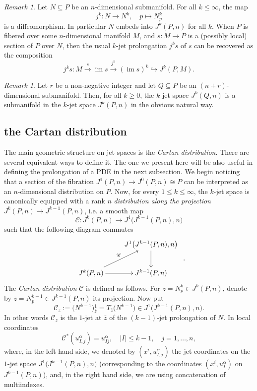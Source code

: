 \documentclass{conm-p-l}
\theoremstyle{definition}
\theoremstyle{remark}
\newtheorem{remark}[theorem]{Remark}
\numberwithin{equation}{section}
\begin{document}
\begin{remark}\label{rem:emb_N}
Let $N \subseteq P$ be an $n$-dimensional submanifold. For all $k \leq \infty$, the map
\[
j^k : N \to N^k, \quad p \mapsto N^k_p
\]
is a diffeomorphism. In particular $N$ embeds into $J^k (P, n)$ for all $k$.  
When $P$ is fibered over some $n$-dimensional manifold $M$, and $s : M \to P$ is a (possibly local) section of $P$ over $N$, then the usual $k$-jet prolongation $j^k s$ of $s$ can be recovered as the composition
\[
j^k s : M \overset{s}{\longrightarrow} \operatorname{im} s \overset{j^k}{\longrightarrow} (\operatorname{im} s)^k \hookrightarrow J^k (P, M).
\]
  
\end{remark}

\begin{remark}\label{rem:jet_emb}
Let $r$ be a non-negative integer and let $Q \subseteq P$ be an $(n+r)$-dimensional submanifold. Then, for all $k \geq 0$, the $k$-jet space $J^k (Q, n)$ is a submanifold in the $k$-jet space $J^k (P, n)$ in the obvious natural way.
\end{remark}

\subsection{the Cartan distribution}\label{Sec:CD}
The main geometric structure on jet spaces is the \emph{Cartan distribution}. There are several equivalent ways to define it. The one we present here will be also useful in defining the prolongation of a PDE in the next subsection. We begin noticing that a section of the fibration $J^1 (P, n) \to J^0 (P, n) \cong P$ can be interpreted as an $n$-dimensional distribution on $P$. Now, for every $1 \leq k \leq \infty$, the $k$-jet space is canonically equipped with a rank $n$ \emph{distribution along the projection $J^{k} (P, n) \to J^{k-1}(P, n)$}, i.e.{} a smooth map
\[
\mathscr C : J^k (P, n) \longrightarrow J^1 \big(J^{k-1} (P, n), n\big)
\]
such that the following diagram commutes
\[
\begin{array}{c}
\xymatrix{
 & J^1 \big(J^{k-1} (P, n), n\big) \ar[d] \\
 J^k (P, n) \ar[ur]^-{\mathscr C} \ar[r] & J^{k-1} (P, n)
}
\end{array}.
\]
The \emph{Cartan distribution} $\mathscr C$ is defined as follows. For $z = N^k_p \in J^k (P, n)$, denote by $\bar z = N^{k-1}_p \in J^{k-1}(P, n)$ its projection. Now put
\[
\mathscr C_z := \big( N^{k-1} \big){}^1_{\bar z} = T_{\bar z} \big(N^{k-1} \big) \in J^1 \big(J^{k-1} (P, n), n\big).
\]
In other words $\mathscr C_z$ is the $1$-jet at $\bar z$ of the $(k-1)$-jet prolongation of $N$. In local coordinates
\begin{equation}\label{eq:C_loc}
\mathscr C^\ast ( u^\alpha_{I, j}) = u^\alpha_{Ij}, \quad |I| \leq k-1, \quad j = 1, \ldots, n,
\end{equation}
where, in the left hand side, we denoted by $(x^i, u^\alpha_{I, j})$ the jet coordinates on the $1$-jet space $J^1 \big(J^{k-1} (P, n), n\big)$ (corresponding to the coordinates $(x^i, u^\alpha_I)$ on $J^{k-1}(P, n)$), and, in the right hand side, we are using concatenation of multiindexes.
\end{document}

